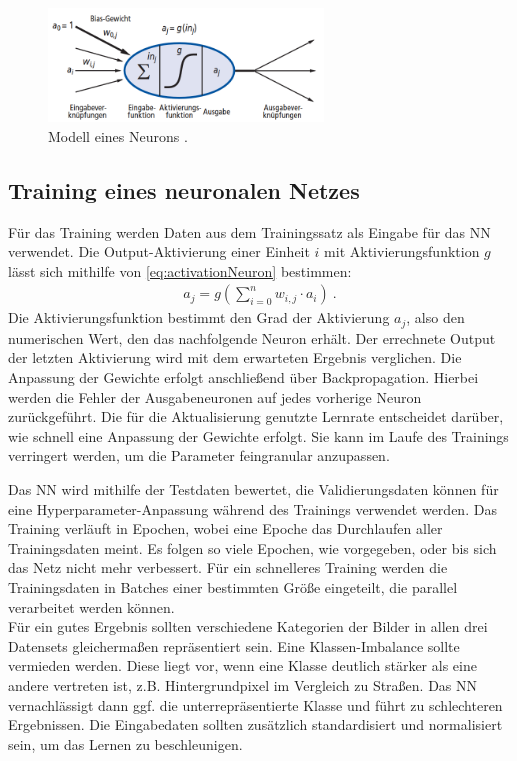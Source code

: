 \begin{figure}
	\centering
	\includegraphics[width=0.65\textwidth]{Bilder/Modell eines Neurons.png} 
	\caption{Modell eines Neurons \cite{Russell.2012}.}
	\label{fig:neuron}
\end{figure} 

\subsection{Training eines neuronalen Netzes}

Für das Training werden Daten aus dem Trainingssatz als Eingabe für das \ac{NN} verwendet.
Die Output-Aktivierung einer Einheit $i$ mit Aktivierungsfunktion $g$ lässt sich mithilfe von \autoref{eq:activationNeuron} bestimmen:
\begin{align}
	\label{eq:activationNeuron} a_j = g(\sum_{i = 0}^{n}w_{i,j} \cdot a_i) ~.
\end{align}
Die Aktivierungsfunktion bestimmt den Grad der Aktivierung $a_j$, also den numerischen Wert, den das nachfolgende Neuron erhält.
Der errechnete Output der letzten Aktivierung wird mit dem erwarteten Ergebnis verglichen.
Die Anpassung der Gewichte erfolgt anschließend über Backpropagation.
Hierbei werden die Fehler der Ausgabeneuronen auf jedes vorherige Neuron zurückgeführt.
Die für die Aktualisierung genutzte Lernrate entscheidet darüber, wie schnell eine Anpassung der Gewichte erfolgt.
Sie kann im Laufe des Trainings verringert werden, um die Parameter feingranular anzupassen.

Das \ac{NN} wird mithilfe der Testdaten bewertet, die Validierungsdaten können für eine Hyperparameter-Anpassung während des Trainings
verwendet werden. Das Training verläuft in Epochen, wobei eine Epoche das Durchlaufen aller Trainingsdaten meint. 
Es folgen so viele Epochen, wie vorgegeben, oder bis sich das Netz nicht mehr verbessert. Für ein schnelleres Training werden die 
Trainingsdaten in Batches einer bestimmten Größe eingeteilt, die parallel verarbeitet werden können. \\  
Für ein gutes Ergebnis sollten verschiedene Kategorien der Bilder in allen drei Datensets gleichermaßen repräsentiert sein.
Eine Klassen-Imbalance sollte vermieden werden.
Diese liegt vor, wenn eine Klasse deutlich stärker als eine andere vertreten ist, z.B. Hintergrundpixel im Vergleich zu Straßen.
Das \ac{NN} vernachlässigt dann ggf. die unterrepräsentierte Klasse und führt zu schlechteren Ergebnissen.
Die Eingabedaten sollten zusätzlich standardisiert und normalisiert sein, um das Lernen zu beschleunigen. 

